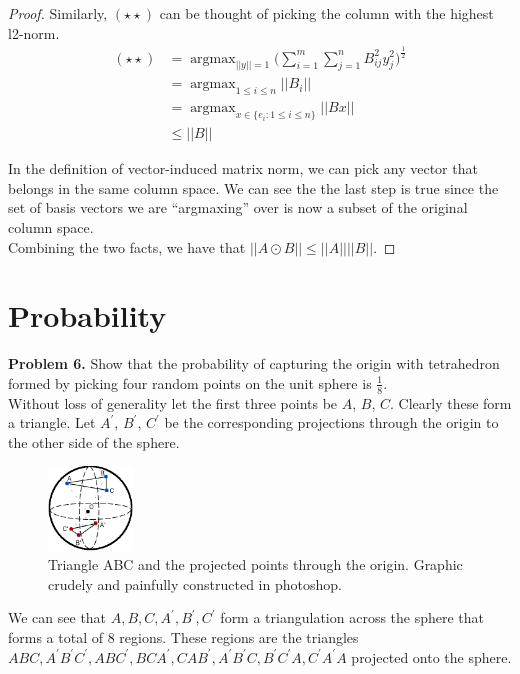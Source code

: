 \documentclass[a4paper]{article}
\DeclareMathOperator*{\argmax}{argmax}
\begin{document}
\begin{proof}
Similarly, $(\star \star)$ can be thought of picking the column with the highest l2-norm.
\begin{align*}
    (\star \star) &= \argmax_{||y|| = 1}
    \Big( \sum_{i=1}^m \sum_{j=1}^n B_{ij}^2 y_j^2 \Big)^\frac{1}{2} \\
    &= \argmax_{1 \leq i \leq n} ||B_i|| \\
    &= \argmax_{x \in \{e_i : 1 \leq i \leq n \}} ||B x|| \\
    &\leq ||B||
\end{align*}

In the definition of vector-induced matrix norm, we can pick any vector that belongs in the same column space. We can see the the last step is true since the set of basis vectors we are ``argmaxing'' over is now a subset of the original column space. \\

Combining the two facts, we have that $||A \odot B|| \leq ||A|| ||B||$.
\end{proof}

\section{Probability}

\textbf{Problem 6.} Show that the probability of capturing the origin with tetrahedron formed by picking four random points on the unit sphere is $\frac{1}{8}$. \\

Without loss of generality let the first three points be $A$, $B$, $C$. Clearly these form a triangle. Let $A^\prime$, $B^\prime$, $C^\prime$ be the corresponding projections through the origin to the other side of the sphere.

\begin{figure}[!h]
\centering
\includegraphics[width=0.2\textwidth]{spherepoints.png}
\caption{Triangle ABC and the projected points through the origin. Graphic crudely and painfully constructed in photoshop.}
\end{figure}

We can see that $A, B, C, A^\prime, B^\prime, C^\prime$ form a triangulation across the sphere that forms a total of 8 regions. These regions are the triangles $A B C, A^\prime B^\prime C^\prime, A B C^\prime, B C A^\prime, C A B^\prime, A^\prime B^\prime C, B^\prime C^\prime A, C^\prime A^\prime A$ projected onto the sphere. \\
\end{document}

